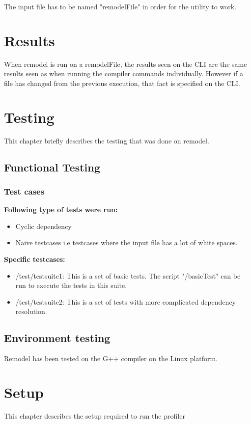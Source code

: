 \documentclass[a4paper, 12pt, notitlepage]{report}
\begin{document}
The input file has to be named "remodelFile" in order for the utility to work.

\chapter{Results}
%
When remodel is run on a remodelFile, the results seen on the CLI are the same results seen as when running the compiler commands individually. However if a file has changed from the previous execution, that fact is specified on the CLI.

\chapter{Testing}
%
This chapter briefly describes the testing that was done on remodel.

\section{Functional Testing}
\subsection{Test cases}
\textbf{Following type of tests were run:}
\begin{itemize}
\item Cyclic dependency
\item Naive testcases i.e testcases where the input file has a lot of white spaces.
\end{itemize}

\textbf{Specific testcases:}
\begin{itemize}
\item /test/testsuite1: This is a set of basic tests. The script "/basicTest" can be run to execute the tests in this suite.
\item /test/testsuite2: This is a set of tests with more complicated dependency resolution. 
\end{itemize}

\section{Environment testing}
Remodel has been tested on the G++ compiler on the Linux platform.

\chapter{Setup}
%
This chapter describes the setup required to run the profiler
\end{document}
